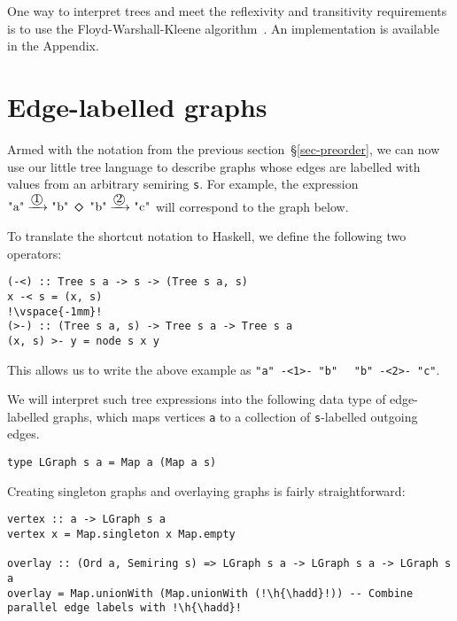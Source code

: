 \documentclass[english,submission]{programming}
\newcommand{\code}[1]{\lstinline[mathescape]|#1|}
\newcommand{\hcode}[1]{{\color{darkblue} \lstinline[keywordstyle={}]|#1|}} %
\newcommand{\h}[1]{{\itshape\color{grayblue}#1}} %
\newcommand{\hadd}{{\large\color{darkblue} $\oplus$}}
\newcommand{\hdia}{\,\text{\raisebox{-0.2mm}{\Large\color{darkblue} $\diamond$}}\,}
\newcommand{\one}{\raisebox{-0.2mm}{\textcircled{1}}\xspace}
\newcommand{\two}{\raisebox{-0.2mm}{\textcircled{2}}\xspace}
\newcommand{\dia}{\,\text{\raisebox{-0.3mm}{\Large $\diamond$}}\,}
\begin{document}
One way to interpret trees and meet the reflexivity and transitivity
requirements is to use the Floyd-Warshall-Kleene
algorithm~\cite{hopcroft_ullman}\cite{kleene1951representation}. An
implementation is available in the Appendix.

\section{Edge-labelled graphs}\label{sec-labelled}

Armed with the notation from the previous section~\S\ref{sec-preorder}, we can
now use our little tree language to describe graphs whose edges are labelled
with values from an arbitrary semiring \hcode{s}. For example, the expression
$\text{\code{"a"}} \xrightarrow{\one} \text{\code{"b"}}\ \dia\ \text{\code{"b"}} \xrightarrow{\two} \text{\code{"c"}}$
will correspond to the graph below.

\vspace{2mm}
\hfill\hfill
\vspace{3mm}

\noindent
To translate the shortcut notation to Haskell, we define the following two
operators:

\begin{lstlisting}
(-<) :: Tree s a -> s -> (Tree s a, s)
x -< s = (x, s)
!\vspace{-1mm}!
(>-) :: (Tree s a, s) -> Tree s a -> Tree s a
(x, s) >- y = node s x y
\end{lstlisting}

\noindent
This allows us to write the above example as
\code{"a"}~\code{-<1>-}~\code{"b"}~\hdia~\code{"b"}~\code{-<2>-}~\code{"c"}.

\newpage
\noindent
We will interpret such tree expressions into the following data type of
edge-labelled graphs, which maps vertices \hcode{a} to a collection of
\hcode{s}-labelled outgoing edges.

\begin{lstlisting}
type LGraph s a = Map a (Map a s)
\end{lstlisting}

\noindent
Creating singleton graphs and overlaying graphs is fairly straightforward:

\begin{lstlisting}
vertex :: a -> LGraph s a
vertex x = Map.singleton x Map.empty

overlay :: (Ord a, Semiring s) => LGraph s a -> LGraph s a -> LGraph s a
overlay = Map.unionWith (Map.unionWith (!\h{\hadd}!)) -- Combine parallel edge labels with !\h{\hadd}!
\end{lstlisting}
\end{document}
